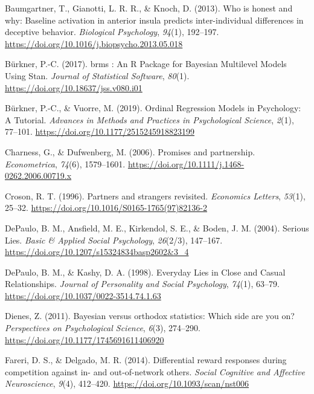 \documentclass[12pt,]{article}
\begin{document}
\leavevmode\hypertarget{ref-Baumgartner2013}{}%
Baumgartner, T., Gianotti, L. R. R., \& Knoch, D. (2013). Who is honest
and why: Baseline activation in anterior insula predicts
inter-individual differences in deceptive behavior. \emph{Biological
Psychology}, \emph{94}(1), 192--197.
\url{https://doi.org/10.1016/j.biopsycho.2013.05.018}

\leavevmode\hypertarget{ref-Burkner2017}{}%
Bürkner, P.-C. (2017). brms : An R Package for Bayesian Multilevel
Models Using Stan. \emph{Journal of Statistical Software}, \emph{80}(1).
\url{https://doi.org/10.18637/jss.v080.i01}

\leavevmode\hypertarget{ref-Burkner2019}{}%
Bürkner, P.-C., \& Vuorre, M. (2019). Ordinal Regression Models in
Psychology: A Tutorial. \emph{Advances in Methods and Practices in
Psychological Science}, \emph{2}(1), 77--101.
\url{https://doi.org/10.1177/2515245918823199}

\leavevmode\hypertarget{ref-Charness2006}{}%
Charness, G., \& Dufwenberg, M. (2006). Promises and partnership.
\emph{Econometrica}, \emph{74}(6), 1579--1601.
\url{https://doi.org/10.1111/j.1468-0262.2006.00719.x}

\leavevmode\hypertarget{ref-Croson1996}{}%
Croson, R. T. (1996). Partners and strangers revisited. \emph{Economics
Letters}, \emph{53}(1), 25--32.
\url{https://doi.org/10.1016/S0165-1765(97)82136-2}

\leavevmode\hypertarget{ref-DePaulo2004}{}%
DePaulo, B. M., Ansfield, M. E., Kirkendol, S. E., \& Boden, J. M.
(2004). Serious Lies. \emph{Basic \& Applied Social Psychology},
\emph{26}(2/3), 147--167.
\url{https://doi.org/10.1207/s15324834basp2602\&3_4}

\leavevmode\hypertarget{ref-DePaulo1998}{}%
DePaulo, B. M., \& Kashy, D. A. (1998). Everyday Lies in Close and
Casual Relationships. \emph{Journal of Personality and Social
Psychology}, \emph{74}(1), 63--79.
\url{https://doi.org/10.1037/0022-3514.74.1.63}

\leavevmode\hypertarget{ref-Dienes2011}{}%
Dienes, Z. (2011). Bayesian versus orthodox statistics: Which side are
you on? \emph{Perspectives on Psychological Science}, \emph{6}(3),
274--290. \url{https://doi.org/10.1177/1745691611406920}

\leavevmode\hypertarget{ref-Fareri2014}{}%
Fareri, D. S., \& Delgado, M. R. (2014). Differential reward responses
during competition against in- and out-of-network others. \emph{Social
Cognitive and Affective Neuroscience}, \emph{9}(4), 412--420.
\url{https://doi.org/10.1093/scan/nst006}
\end{document}
